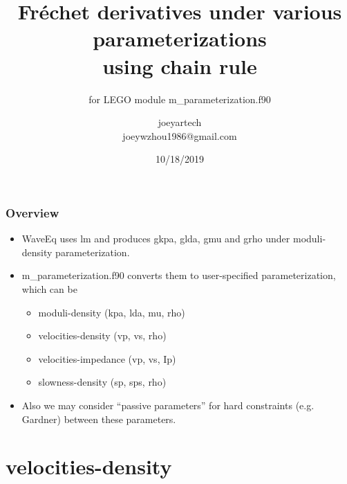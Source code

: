 \documentclass[9pt]{beamer}
\title{Fr\'echet derivatives under various parameterizations \\ using chain rule}
\subtitle{for LEGO module m\_parameterization.f90}
\author{joeyartech\\
\scriptsize{joeywzhou1986@gmail.com}}
\institute{The University of Texas at Dallas}
\date{10/18/2019}
\begin{document}

\maketitle \clearpage


\begin{frame}\frametitle{Overview}
  
  \begin{center}
  \end{center}

  \begin{itemize}
    \item WaveEq uses lm and produces gkpa, glda, gmu and grho under moduli-density parameterization.
    \item m\_parameterization.f90 converts them to user-specified parameterization, which can be
    \begin{itemize}
      \item moduli-density (kpa, lda, mu, rho)
      \item velocities-density (vp, vs, rho)
      \item velocities-impedance (vp, vs, Ip)
      \item slowness-density (sp, sps, rho)
    \end{itemize}
    \item Also we may consider ``passive parameters'' for hard constraints (e.g. Gardner) between these parameters.
  \end{itemize}

\end{frame}

\section{velocities-density}
\end{document}
